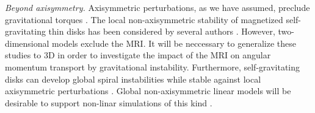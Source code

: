 %




\emph{Beyond axisymmetry.} Axisymmetric perturbations, as we have
assumed, preclude gravitational torques \citep{lynden-bell72}. 
The local non-axisymmetric stability of magnetized self-gravitating
thin disks has been considered by several authors
\citep{elmegreen87,gammie96,fan97,kim01}. However, two-dimensional models
exclude the MRI. It will be neccessary to generalize these studies to
3D in order to investigate the impact of the MRI on angular momentum
transport by gravitational instability. Furthermore, self-gravitating
disks can develop global spiral instabilities while stable against local 
axisymmetric perturbations \citep{papaloizou89,papaloizou91}. Global
non-axisymmetric linear models will be desirable to support non-linar
simulations of this kind \citep{fromang04c,fromang05}.   



%


